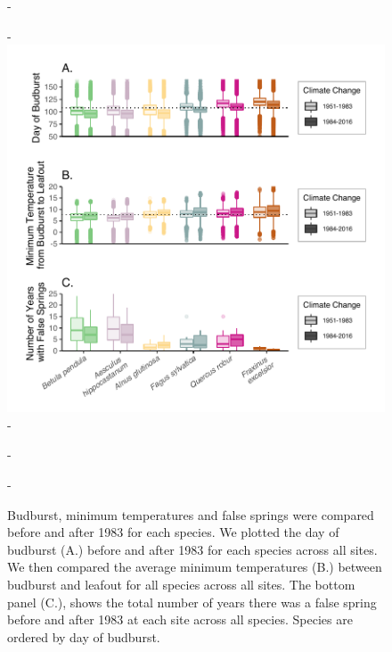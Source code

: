 \documentclass{article}\usepackage[]{graphicx}\usepackage[]{color}
\begin{document}
{\begin{figure} [H]
  -\begin{center}
  -\includegraphics[width=14cm]{..//figures/Boxplot_BBTminFS.pdf}
  -\caption{Budburst, minimum temperatures and false springs were compared before and after 1983 for each species. We plotted the day of budburst (A.) before and after 1983 for each species across all sites. We then compared the average minimum temperatures (B.) between budburst and leafout for all species across all sites. The bottom panel (C.), shows the total number of years there was a false spring before and after 1983 at each site across all species. Species are ordered by day of budburst.  }\label{fig:boxfs}
  -\end{center}
  -\end{figure}}
  
\end{document}
